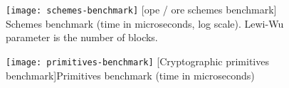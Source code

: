 \begin{figure}[!ht]
	\centering
	\begin{minipage}[t]{0.48\columnwidth}
		\captionsetup[figure]{justification=centering}
		\centering
		\texttt{[image: schemes-benchmark]}
		[\acrshort{ope} / \acrshort{ore} schemes benchmark]{
			Schemes benchmark (time in microseconds, log scale).
			Lewi-Wu parameter is the number of blocks.
		}%
		\label{figure:benchmarks:schemes}
	\end{minipage}
	\hfill
	\begin{minipage}[t]{0.48\columnwidth}
		\captionsetup[figure]{justification=centering}
		\centering
		\texttt{[image: primitives-benchmark]}
		[Cryptographic primitives benchmark]{Primitives benchmark (time in microseconds)}%
		\label{figure:benchmarks:primitives}
	\end{minipage}
\end{figure}
